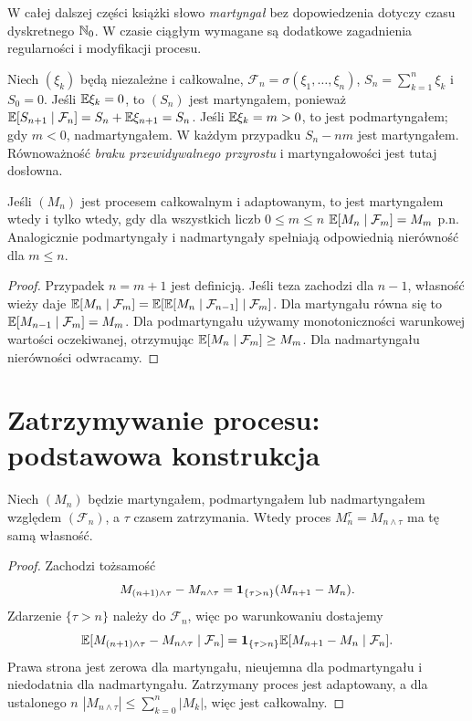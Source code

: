 W całej dalszej części książki słowo \emph{martyngał}
bez dopowiedzenia dotyczy czasu dyskretnego
$\mathbb{N}_0$. W czasie ciągłym wymagane są dodatkowe
zagadnienia regularności i modyfikacji procesu.

\begin{przyklad}
Niech $(\xi_k)$ będą niezależne i całkowalne,
$\mathcal F_n=\sigma(\xi_1,\ldots,\xi_n)$,
$S_n=\sum_{k=1}^n\xi_k$ i $S_0=0$.
Jeśli $\mathbb{E}\xi_k=0$, to $(S_n)$ jest martyngałem,
ponieważ
$\mathbb{E}[S_{n+1}\mid\mathcal F_n]
=S_n+\mathbb{E}\xi_{n+1}=S_n$.
Jeśli $\mathbb{E}\xi_k=m>0$, to jest podmartyngałem;
gdy $m<0$, nadmartyngałem. W każdym przypadku
$S_n-nm$ jest martyngałem. Równoważność
\emph{braku przewidywalnego przyrostu}
i martyngałowości jest tutaj dosłowna.
\end{przyklad}

\begin{twierdzenie}
Jeśli $(M_n)$ jest procesem całkowalnym i
adaptowanym, to jest martyngałem wtedy i tylko wtedy,
gdy dla wszystkich liczb $0\leq m\leq n$
$\mathbb{E}[M_n\mid\mathcal F_m]=M_m$ p.n.
Analogicznie podmartyngały i nadmartyngały
spełniają odpowiednią nierówność dla $m\leq n$.
\end{twierdzenie}
\begin{proof}
Przypadek $n=m+1$ jest definicją. Jeśli teza
zachodzi dla $n-1$, własność wieży daje
$\mathbb{E}[M_n\mid\mathcal F_m]
=\mathbb{E}[\mathbb{E}[M_n\mid\mathcal F_{n-1}]\mid\mathcal F_m]$.
Dla martyngału równa się to
$\mathbb{E}[M_{n-1}\mid\mathcal F_m]=M_m$.
Dla podmartyngału używamy monotoniczności
warunkowej wartości oczekiwanej, otrzymując
$\mathbb{E}[M_n\mid\mathcal F_m]\geq M_m$.
Dla nadmartyngału nierówności odwracamy.
\end{proof}

\section{Zatrzymywanie procesu: podstawowa konstrukcja}

\begin{twierdzenie}
Niech $(M_n)$ będzie martyngałem, podmartyngałem
lub nadmartyngałem względem $(\mathcal F_n)$,
a $\tau$ czasem zatrzymania. Wtedy proces
$M_n^\tau=M_{n\wedge\tau}$ ma tę samą własność.
\end{twierdzenie}
\begin{proof}
Zachodzi tożsamość
\[
M_{(n+1)\wedge\tau}-M_{n\wedge\tau}
=\mathbf{1}_{\{\tau>n\}}(M_{n+1}-M_n).
\]
Zdarzenie $\{\tau>n\}$ należy do $\mathcal F_n$,
więc po warunkowaniu dostajemy
\[
\mathbb{E}[M_{(n+1)\wedge\tau}-M_{n\wedge\tau}
\mid\mathcal F_n]
=\mathbf{1}_{\{\tau>n\}}\mathbb{E}[M_{n+1}-M_n\mid\mathcal F_n].
\]
Prawa strona jest zerowa dla martyngału,
nieujemna dla podmartyngału i niedodatnia
dla nadmartyngału. Zatrzymany proces jest
adaptowany, a dla ustalonego $n$
$|M_{n\wedge\tau}|\leq\sum_{k=0}^n|M_k|$,
więc jest całkowalny.
\end{proof}

